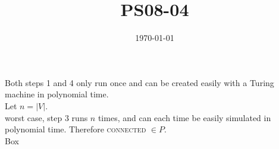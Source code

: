 \documentclass{article}
\title{PS08-04}
\date{\today}
\begin{document}
\maketitle

Both steps 1 and 4 only run once and can be created easily with a Turing machine in polynomial time.\\
Let $n = \lvert V \rvert$.\\
worst case, step 3 runs $n$ times, and can each time be easily simulated in polynomial time. Therefore \textsc{connected} $\in P$.\\
Box
\end{document}

